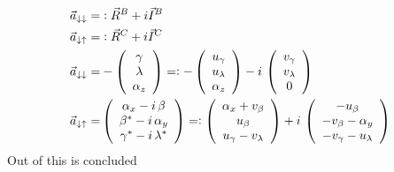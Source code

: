 \documentclass{article}
\begin{document}
\begin{align*}
    \vec{a}_{\downarrow\downarrow}=&\vcentcolon\vec{R}^B+i\vec{I}^B\\
    \vec{a}_{\downarrow\uparrow}=&\vcentcolon\vec{R}^C+i\vec{I}^C   \\
    \vec{a}_{\downarrow\downarrow}=&-\left( \begin{array}{c}
         \gamma \\
         \lambda\\
         \alpha_z
    \end{array} \right)
    =\vcentcolon-\left( \begin{array}{c}
         u_\gamma \\
         u_\lambda\\
         \alpha_z
    \end{array} \right)
    -i\,\left( \begin{array}{c}
         v_\gamma \\
         v_\lambda\\
         0
    \end{array} \right)\\
    \vec{a}_{\downarrow\uparrow}=&\left( \begin{array}{c}
         \alpha_x-i\,\beta \\
         \beta^*-i\,\alpha_y\\
         \gamma^*-i\,\lambda^*
    \end{array} \right)
    =\vcentcolon\left( \begin{array}{c}
         \alpha_x + v_\beta \\
         u_\beta\\
         u_\gamma-v_\lambda
    \end{array} \right)
    +i\,\left( \begin{array}{c}
        - u_\beta \\
         -v_\beta-\alpha_y\\
         -v_\gamma-u_\lambda
    \end{array} \right)
\end{align*}
Out of this is concluded
\end{document}
